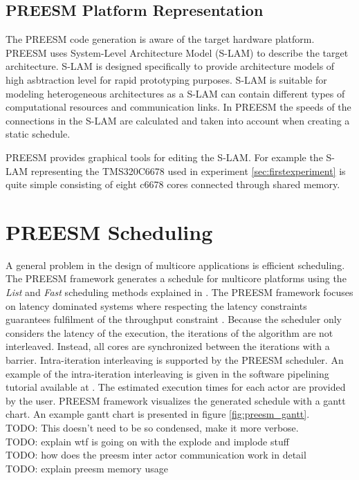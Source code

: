 \subsection{PREESM Platform Representation}
The PREESM code generation is aware of the target hardware platform. PREESM
uses System-Level Architecture Model (S-LAM) \cite{pelcat2009system} to
describe the target architecture. S-LAM is designed specifically to provide
architecture models of high asbtraction level for rapid prototyping purposes.
S-LAM is suitable for modeling heterogeneous architectures as a S-LAM can
contain different types of computational resources and communication links. In
PREESM the speeds of the connections in the S-LAM are calculated and taken into
account when creating a static schedule. \cite{pelcat2009system}

PREESM provides graphical tools for editing the S-LAM. For example the S-LAM
representing the TMS320C6678 used in experiment \ref{sec:firstexperiment} is
quite simple consisting of eight c6678 cores connected through shared memory.

\section{PREESM Scheduling}
\label{sec:preesmsched}
A general problem in the design of multicore applications is efficient
scheduling. The PREESM framework generates a schedule for multicore platforms
using the \textit{List} and \textit{Fast} scheduling methods explained in
\cite{kwok1997high}. The PREESM framework focuses on latency dominated systems
where respecting the latency constraints guarantees fulfilment of the throughput
constraint \cite{pelcat2014preesm, ghamarian2006throughput}. Because the
scheduler only considers the latency of the execution, the iterations of the
algorithm are not interleaved. Instead, all cores are synchronized between the
iterations with a barrier. Intra-iteration interleaving is supported by the
PREESM scheduler. \cite{pelcat2014preesm} An example of the intra-iteration
interleaving is given in the software pipelining tutorial available at
\cite{preesm}. The estimated execution times for each actor are provided by the
user. PREESM framework visualizes the generated schedule with a gantt chart. An
example gantt chart is presented in figure \ref{fig:preesm_gantt}.\\
TODO: This doesn't need to be so condensed, make it more verbose.\\
TODO: explain wtf is going on with the explode and implode stuff \\
TODO: how does the preesm inter actor communication work in detail \\
TODO: explain preesm memory usage
